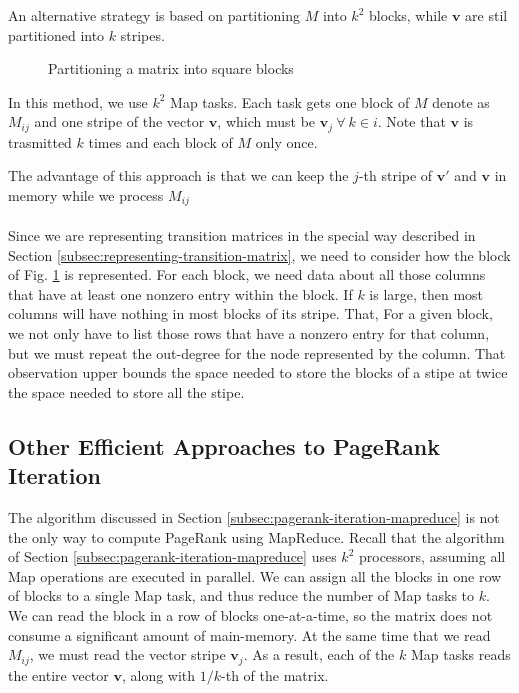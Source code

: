 An alternative strategy is based on partitioning $M$ into $k^2$ blocks, while $\textbf{v}$ are stil partitioned into $k$ stripes.

\begin{figure}[H]
\centering
\scalebox{1}{
    
}
\caption{Partitioning a matrix into square blocks}
\label{fig:partitioned-matrix}
\end{figure}

In this method, we use $k^2$ Map tasks. Each task gets one block of $M$ denote as $M_{ij}$ and one stripe of the vector $\textbf{v}$, which must be $\textbf{v}_j \ \forall \ k \in  i$. Note that $\textbf{v}$ is trasmitted $k$ times and each block of $M$ only once.

The advantage of this approach is that we can keep the $j$-th stripe of $\textbf{v}'$ and $\textbf{v}$ in memory while we process $M_{ij}$\\
\\
Since we are representing transition matrices in the special way described in Section \ref{subsec:representing-transition-matrix}, we need to consider how the block of Fig. \ref{fig:partitioned-matrix} is represented. For each block, we need data about all those columns that have at least one nonzero entry within the block. If $k$ is large, then most columns will have nothing in most blocks of its stripe. That, For a given block, we not only have to list those rows that have a nonzero entry for that column, but we must repeat the out-degree for the node represented by the column. That observation upper bounds the space needed to store the blocks of a stipe at twice the space needed to store all the stipe. 

\subsection{Other Efficient Approaches to PageRank Iteration}\label{subsec:other-efficient-approaches-pagerank-iteration}

The algorithm discussed in Section \ref{subsec:pagerank-iteration-mapreduce} is not the only way to compute PageRank using MapReduce. Recall that the algorithm of Section \ref{subsec:pagerank-iteration-mapreduce} uses $k^2$ processors, assuming all Map operations are executed in parallel. We can assign all the blocks in one row of blocks to a single Map task, and thus reduce the number of Map tasks to $k$. We can read the block in a row of blocks one-at-a-time, so the matrix does not consume a significant amount of main-memory. At the same time that we read $M_{ij}$, we must read the vector stripe $\textbf{v}_j$. As a result, each of the $k$ Map tasks reads the entire vector $\textbf{v}$, along with $1/k$-th of the matrix.

